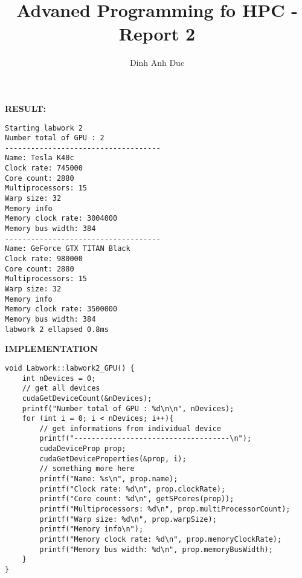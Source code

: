 \documentclass[10pt, a4paper]{article}
\title{Advaned Programming fo HPC - Report 2}
\author{Dinh Anh Duc}
\begin{document}
\maketitle

\textbf{RESULT:}
\begin{verbatim}
Starting labwork 2
Number total of GPU : 2
------------------------------------
Name: Tesla K40c
Clock rate: 745000
Core count: 2880
Multiprocessors: 15
Warp size: 32
Memory info
Memory clock rate: 3004000
Memory bus width: 384
------------------------------------
Name: GeForce GTX TITAN Black
Clock rate: 980000
Core count: 2880
Multiprocessors: 15
Warp size: 32
Memory info
Memory clock rate: 3500000
Memory bus width: 384
labwork 2 ellapsed 0.8ms
\end{verbatim}
\textbf{IMPLEMENTATION}
\begin{verbatim}
void Labwork::labwork2_GPU() {
    int nDevices = 0;
    // get all devices
    cudaGetDeviceCount(&nDevices);
    printf("Number total of GPU : %d\n\n", nDevices);
    for (int i = 0; i < nDevices; i++){
        // get informations from individual device
        printf("------------------------------------\n");
        cudaDeviceProp prop;
        cudaGetDeviceProperties(&prop, i);
        // something more here
        printf("Name: %s\n", prop.name);
        printf("Clock rate: %d\n", prop.clockRate);
        printf("Core count: %d\n", getSPcores(prop));
        printf("Multiprocessors: %d\n", prop.multiProcessorCount);
        printf("Warp size: %d\n", prop.warpSize);
        printf("Memory info\n");
        printf("Memory clock rate: %d\n", prop.memoryClockRate);
        printf("Memory bus width: %d\n", prop.memoryBusWidth);
    }
}
\end{verbatim}
\end{document}

